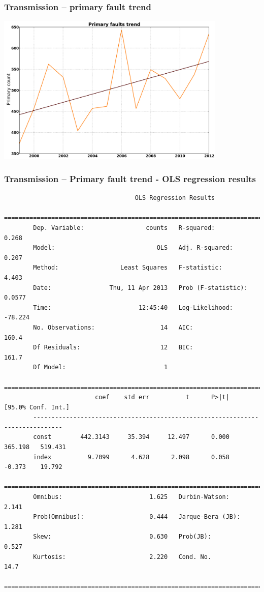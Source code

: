 \documentclass[aspectratio=169]{beamer}
\begin{document}
\frame
{\frametitle{Transmission -- primary fault trend}
\begin{center}
\includegraphics[width=11cm]{./notebooks/125_years_of_data_files/125_years_of_data_fig_08.pdf} 
\end{center}
}

\begin{frame}[fragile]
  \frametitle{Transmission -- Primary fault trend - OLS regression results}
\scriptsize
\begin{verbatim}
                                    OLS Regression Results                            
        ==============================================================================
        Dep. Variable:                 counts   R-squared:                       0.268
        Model:                            OLS   Adj. R-squared:                  0.207
        Method:                 Least Squares   F-statistic:                     4.403
        Date:                Thu, 11 Apr 2013   Prob (F-statistic):             0.0577
        Time:                        12:45:40   Log-Likelihood:                -78.224
        No. Observations:                  14   AIC:                             160.4
        Df Residuals:                      12   BIC:                             161.7
        Df Model:                           1                                         
        ==============================================================================
                         coef    std err          t      P>|t|      [95.0% Conf. Int.]
        ------------------------------------------------------------------------------
        const        442.3143     35.394     12.497      0.000       365.198   519.431
        index          9.7099      4.628      2.098      0.058        -0.373    19.792
        ==============================================================================
        Omnibus:                        1.625   Durbin-Watson:                   2.141
        Prob(Omnibus):                  0.444   Jarque-Bera (JB):                1.281
        Skew:                           0.630   Prob(JB):                        0.527
        Kurtosis:                       2.220   Cond. No.                         14.7
        ==============================================================================
\end{verbatim}
\end{frame}
\end{document}
